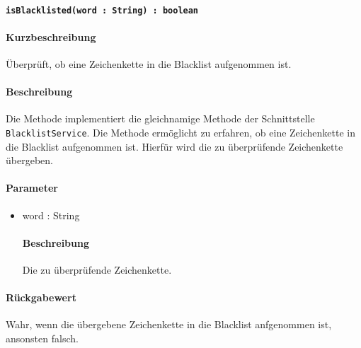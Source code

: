 \paragraph{\texttt{isBlacklisted(word : String) : boolean}}%
\paragraph*{Kurzbeschreibung}
Überprüft, ob eine Zeichenkette in die Blacklist aufgenommen ist.
\paragraph*{Beschreibung}
Die Methode implementiert die gleichnamige Methode der Schnittstelle \texttt{BlacklistService}.
Die Methode ermöglicht zu erfahren, ob eine Zeichenkette in die Blacklist aufgenommen ist.
Hierfür wird die zu überprüfende Zeichenkette übergeben.
\paragraph*{Parameter}
\begin{itemize}
    \item word : String
    		\paragraph*{Beschreibung}
    		Die zu überprüfende Zeichenkette.
\end{itemize}
\paragraph*{Rückgabewert}
Wahr, wenn die übergebene Zeichenkette in die Blacklist anfgenommen ist, ansonsten falsch.
